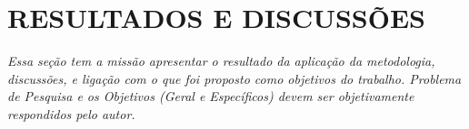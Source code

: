 \chapter{RESULTADOS E DISCUSSÕES}

\textit{Essa seção tem a missão apresentar o resultado da aplicação da metodologia, discussões, e ligação com o que foi proposto como objetivos do trabalho. Problema de Pesquisa e os Objetivos (Geral e Específicos) devem ser objetivamente respondidos pelo autor.}
